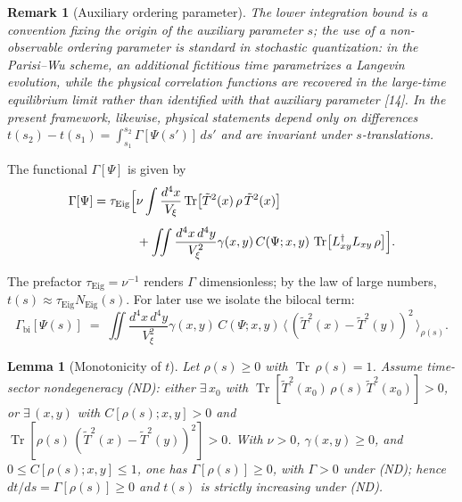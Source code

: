 \documentclass[12pt,a4paper]{article}
\newtheorem{lemma}{Lemma}[section]
\newtheorem{remark}{Remark}[section]
\renewcommand{\Tr}{\operatorname{Tr}}
\newcommand{\Vxi}{V_\xi}          %
\newcommand{\intx}{\int \frac{d^4x}{\Vxi}}
\newcommand{\intxy}{\iint \frac{d^4x\,d^4y}{\Vxi^2}}
\numberwithin{equation}{section}
\begin{document}
\begin{remark}[Auxiliary ordering parameter]
The lower integration bound is a convention fixing the origin of the auxiliary
parameter $s$; the use of a non-observable ordering parameter is
standard in stochastic quantization: in the Parisi--Wu scheme, an
additional fictitious time parametrizes a Langevin evolution, while the
physical correlation functions are recovered in the large-time equilibrium
limit rather than identified with that auxiliary parameter [14]. In the present framework, likewise, physical statements depend only on differences
$t(s_2)-t(s_1)=\int_{s_1}^{s_2}\Gamma[\Psi(s')]\,ds'$ and are invariant under $s$-translations.
\end{remark}

\noindent The functional $\Gamma[\Psi]$ is given by
\begin{equation}
\begin{split}
\Gamma[\Psi] = \tau_{\mathrm{Eig}} \Bigl[
&\nu \intx \Tr\bigl[\tilde{T}^2(x)\,\rho\,\tilde{T}^2(x)\bigr] \\[4pt]
&+ \intxy \gamma(x,y)\,C(\Psi;x,y)\,\Tr\bigl[L_{xy}^\dagger L_{xy}\,\rho\bigr]
\Bigr].
\end{split}
\label{eq:gamma-decomposition}
\end{equation}

The prefactor $\tau_{\mathrm{Eig}}=\nu^{-1}$ renders $\Gamma$ dimensionless; by the law of large numbers, $t(s)\approx \tau_{\mathrm{Eig}}N_{\mathrm{Eig}}(s)$. For later use we isolate the bilocal term:
\begin{equation}
\Gamma_{\mathrm{bi}}[\Psi(s)] \;=\; 
\intxy \gamma(x,y)\,C(\Psi;x,y)\,
\big\langle\,(\tilde{T}^2(x)-\tilde{T}^2(y))^2\,\big\rangle_{\rho(s)}.
\label{eq:Gamma-bilocal}
\end{equation}

\begin{lemma}[Monotonicity of $t$]
\label{lem:Gamma-positive}
Let $\rho(s)\!\ge\!0$ with $\Tr\,\rho(s)=1$. Assume time-sector
nondegeneracy (ND): either $\exists\,x_0$ with
$\Tr[\tilde{T}^2(x_0)\,\rho(s)\,\tilde{T}^2(x_0)]>0$, or $\exists\,(x,y)$ with
$C[\rho(s);x,y]>0$ and
$\Tr[\rho(s)\,( \tilde{T}^2(x)-\tilde{T}^2(y) )^2]>0$. With $\nu>0$,
$\gamma(x,y)\ge 0$, and $0\le C[\rho(s);x,y]\le 1$, one has
$\Gamma[\rho(s)]\ge 0$, with $\Gamma>0$ under (ND); hence $dt/ds=\Gamma[\rho(s)]\ge 0$ and $t(s)$ is strictly
increasing under (ND).
\end{lemma}
\end{document}
